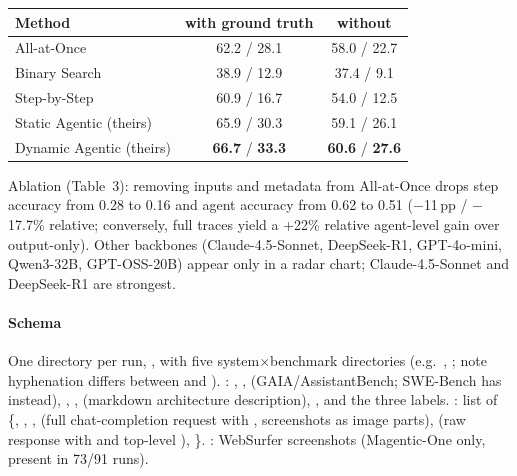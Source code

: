 \begin{center}\small
\begin{tabular}{@{}lcc@{}}\toprule
Method & with ground truth & without\\\midrule
All-at-Once & 62.2 / 28.1 & 58.0 / 22.7\\
Binary Search & 38.9 / 12.9 & 37.4 / 9.1\\
Step-by-Step & 60.9 / 16.7 & 54.0 / 12.5\\
Static Agentic (theirs) & 65.9 / 30.3 & 59.1 / 26.1\\
Dynamic Agentic (theirs) & \textbf{66.7} / \textbf{33.3} & \textbf{60.6} / \textbf{27.6}\\\bottomrule
\end{tabular}
\end{center}
Ablation (Table~3): removing inputs and metadata from All-at-Once drops step accuracy from 0.28 to 0.16 and agent accuracy from 0.62 to 0.51 ($-$11\,pp / $-$17.7\% relative; conversely, full traces yield a +22\% relative agent-level gain over output-only). Other backbones (Claude-4.5-Sonnet, DeepSeek-R1, GPT-4o-mini, Qwen3-32B, GPT-OSS-20B) appear only in a radar chart; Claude-4.5-Sonnet and DeepSeek-R1 are strongest.

\paragraph{Schema} One directory per run, , with five system$\times$benchmark directories (e.g.\ , ; note hyphenation differs between  and ). : , ,  (GAIA/\allowbreak AssistantBench; SWE-Bench has  instead), , ,  (markdown architecture description), , and the three labels. : list of \{, , ,  (full chat-completion request with , screenshots as image parts),  (raw response with  and top-level ), \}. : WebSurfer screenshots (Magentic-One only, present in 73/91 runs).

